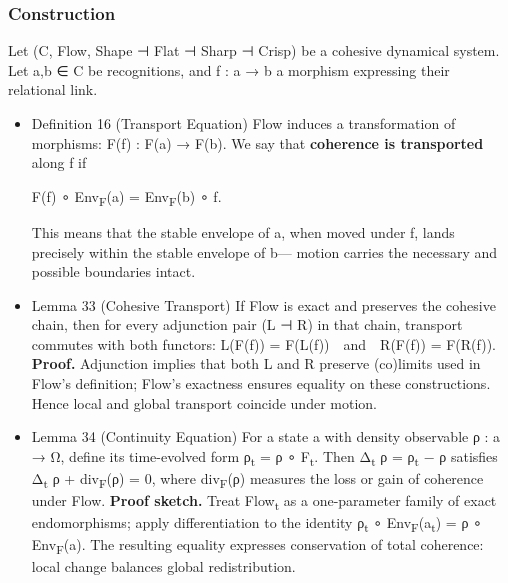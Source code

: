 \documentclass[11pt]{article}
\begin{document}
\subsubsection*{Construction}
\label{sec:org4b52a69}
Let (C, Flow, Shape ⊣ Flat ⊣ Sharp ⊣ Crisp) be a cohesive dynamical system.  
Let a,b ∈ C be recognitions, and f : a → b a morphism expressing their relational link.
\begin{itemize}
\item Definition 16 (Transport Equation)
\label{sec:orge249a3c}
Flow induces a transformation of morphisms:
F(f) : F(a) → F(b).  
We say that \textbf{coherence is transported} along f if  

F(f) ∘ Env\textsubscript{F}(a) = Env\textsubscript{F}(b) ∘ f.  

This means that the stable envelope of a, when moved under f,  
lands precisely within the stable envelope of b—  
motion carries the necessary and possible boundaries intact.
\item Lemma 33 (Cohesive Transport)
\label{sec:org389711f}
If Flow is exact and preserves the cohesive chain,  
then for every adjunction pair (L ⊣ R) in that chain,  
transport commutes with both functors:
L(F(f)) = F(L(f)) and R(F(f)) = F(R(f)).  
\textbf{Proof.}  
Adjunction implies that both L and R preserve (co)limits used in Flow’s definition;  
Flow’s exactness ensures equality on these constructions.  
Hence local and global transport coincide under motion.
\item Lemma 34 (Continuity Equation)
\label{sec:org83bd98f}
For a state a with density observable ρ : a → Ω,  
define its time-evolved form ρ\textsubscript{t} = ρ ∘ F\textsubscript{t}.  
Then  Δ\textsubscript{t} ρ = ρ\textsubscript{t} − ρ  satisfies  
Δ\textsubscript{t} ρ + div\textsubscript{F}(ρ) = 0,  
where div\textsubscript{F}(ρ) measures the loss or gain of coherence under Flow.  
\textbf{Proof sketch.}  
Treat Flow\textsubscript{t} as a one-parameter family of exact endomorphisms;  
apply differentiation to the identity ρ\textsubscript{t} ∘ Env\textsubscript{F}(a\textsubscript{t}) = ρ ∘ Env\textsubscript{F}(a).  
The resulting equality expresses conservation of total coherence:  
local change balances global redistribution.
\end{itemize}
\end{document}
